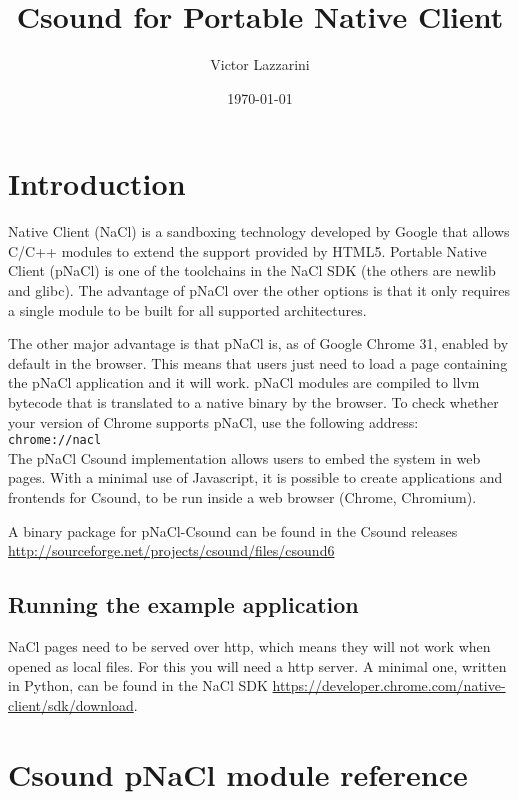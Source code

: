 \documentclass[11pt]{article}
\begin{document}
\title{Csound for Portable Native Client}
\author{Victor Lazzarini}
\date{\today}
\maketitle

\section{Introduction}

Native Client (NaCl) is a sandboxing technology developed by Google that allows C/C++ modules to extend the support provided
by HTML5. Portable Native Client (pNaCl) is one of the toolchains in the NaCl SDK (the others are newlib and glibc). The advantage
of pNaCl over the other options is that it only requires a single module to be built for all supported architectures.

The other major advantage is that pNaCl is, as of Google Chrome 31, enabled by default in the browser. This means that users
just need to load a page containing the pNaCl application and it will work. pNaCl modules are compiled to llvm bytecode that is 
translated to a native binary by the browser. To check whether your version of Chrome supports pNaCl, use the following address:
\\

 {\tt chrome://nacl }
\\

The pNaCl Csound implementation allows users to embed the system in web pages. With a minimal use of Javascript, it is possible
to create applications and frontends for Csound, to be run inside a web browser (Chrome, Chromium).

A binary package for pNaCl-Csound can be found in the Csound releases \url{http://sourceforge.net/projects/csound/files/csound6}

\subsection{Running the example application}

NaCl pages need to be served over http, which means they will not work
when opened as local files. For this you will need a http server. A
minimal one, written in Python, can be found in the NaCl SDK 
\url{https://developer.chrome.com/native-client/sdk/download}.

\section{Csound pNaCl module reference}
\end{document}
